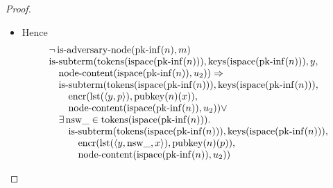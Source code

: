 \documentclass[11pt]{article}
\theoremstyle{plain}
\begin{document}
\begin{proof}
\begin{itemize}[leftmargin=2.8em, itemsep=4pt, parsep=1pt]
\begin{itemize}[leftmargin=2.8em, itemsep=4pt, parsep=1pt]
  \item[\textbf{288--291}] Hence 
\begin{equation*}
\begin{array}{@{}l@{}}
\neg \operatorname{is\text{-}adversary\text{-}node}(\operatorname{pk\text{-}inf}(n), m) \\
\begin{array}{@{}l@{}} \operatorname{is\text{-}subterm}(\operatorname{tokens}(\operatorname{ispace}(\operatorname{pk\text{-}inf}(n))), \operatorname{keys}(\operatorname{ispace}(\operatorname{pk\text{-}inf}(n))), y, \\ \quad \operatorname{node\text{-}content}(\operatorname{ispace}(\operatorname{pk\text{-}inf}(n)), u_{2})) \Rightarrow \\ \quad \operatorname{is\text{-}subterm}(\operatorname{tokens}(\operatorname{ispace}(\operatorname{pk\text{-}inf}(n))), \operatorname{keys}(\operatorname{ispace}(\operatorname{pk\text{-}inf}(n))), \\ \quad \quad \operatorname{encr}(\operatorname{lst}(\langle y, p \rangle), \operatorname{pubkey}(n)(x)), \\ \quad \quad \operatorname{node\text{-}content}(\operatorname{ispace}(\operatorname{pk\text{-}inf}(n)), u_{2})) \vee \\ \quad \exists \operatorname{nsw\_} \in \operatorname{tokens}(\operatorname{ispace}(\operatorname{pk\text{-}inf}(n))). \\ \quad \quad \operatorname{is\text{-}subterm}(\operatorname{tokens}(\operatorname{ispace}(\operatorname{pk\text{-}inf}(n))), \operatorname{keys}(\operatorname{ispace}(\operatorname{pk\text{-}inf}(n))), \\ \quad \quad \quad \operatorname{encr}(\operatorname{lst}(\langle y, \operatorname{nsw\_}, x \rangle), \operatorname{pubkey}(n)(p)), \\ \quad \quad \quad \operatorname{node\text{-}content}(\operatorname{ispace}(\operatorname{pk\text{-}inf}(n)), u_{2})) \end{array} \\

\end{array}
\end{equation*}
\end{itemize}
\end{itemize}
\end{proof}
\end{document}
